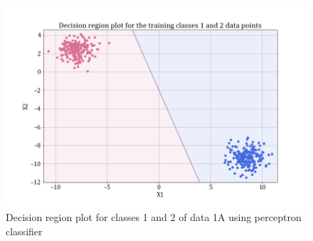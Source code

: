 \documentclass[11pt,a4paper]{article}
\begin{document}
\begin{figure}[H]
    \centering
    \includegraphics[scale = 0.35]{images/training classes 1 and 2dec_reg_perceptron.png}
    \caption{Decision region plot for classes 1 and 2 of data 1A using perceptron classifier}
    \label{fig:perc_dec_reg_12}
\end{figure}
\end{document}
